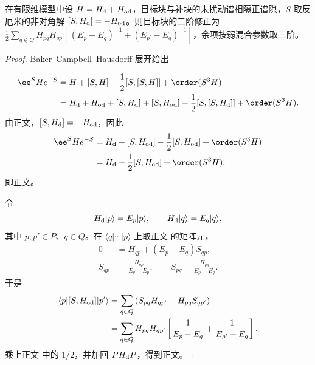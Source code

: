 \begin{proposition}
在有限维模型中设 $H=H_{\rm d}+H_{\rm od}$，目标块与补块的未扰动谱相隔正谱隙，$S$ 取反厄米的非对角解 $[S,H_{\rm d}]=-H_{\rm od}$。则目标块的二阶修正为 $\frac12\sum_{q\in Q}H_{pq}H_{qp^\prime}[(E_p-E_q)^{-1}+(E_{p^\prime}-E_q)^{-1}]$，余项按弱混合参数取三阶。
\end{proposition}
\begin{proof}
Baker--Campbell--Hausdorff 展开给出

\begin{align*}
 \ee^SHe^{-S}
 &=H+[S,H]+\frac12[S,[S,H]]+\order(S^3H)\\
 &=H_{\rm d}+H_{\rm od}+[S,H_{\rm d}]+[S,H_{\rm od}]
 +\frac12[S,[S,H_{\rm d}]]+\order(S^3H).
\end{align*}
由正文，$[S,H_{\rm d}]=-H_{\rm od}$，因此
\begin{align*}
 \ee^SHe^{-S}
 &=H_{\rm d}+[S,H_{\rm od}]
 -\frac12[S,H_{\rm od}]+\order(S^3H)\\
 &=H_{\rm d}+\frac12[S,H_{\rm od}]+\order(S^3H),
\end{align*}
即正文。

令
\begin{equation*}
 H_{\rm d}|p\rangle=E_p|p\rangle,
 \qquad
 H_{\rm d}|q\rangle=E_q|q\rangle,
\end{equation*}
其中 $p,p'\in P$、$q\in Q$。在 $\langle q|\cdots|p\rangle$ 上取正文 的矩阵元，
\begin{align*}
 0&=H_{qp}+(E_p-E_q)S_{qp},\\
 S_{qp}&=\frac{H_{qp}}{E_q-E_p},
 \qquad
 S_{pq}=\frac{H_{pq}}{E_p-E_q}.
\end{align*}
于是
\begin{align*}
 \langle p|[S,H_{\rm od}]|p'\rangle
 &=\sum_{q\in Q}
 \left(S_{pq}H_{qp'}-H_{pq}S_{qp'}\right)\\
 &=\sum_{q\in Q}H_{pq}H_{qp'}
 \left[
 \frac1{E_p-E_q}
 +\frac1{E_{p'}-E_q}
 \right].
\end{align*}
乘上正文 中的 $1/2$，并加回 $P H_{\rm d}P$，得到正文。
\end{proof}

